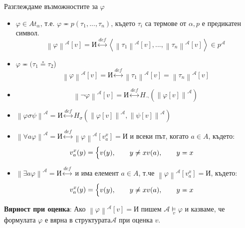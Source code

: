 \documentclass{article}
\renewcommand{\\}{\newline}
\newcommand{\I}{\text{И}}
\begin{document}
Разглеждаме възможностите за \(\varphi\)  
\begin{itemize}
    \item \(\varphi \in At_{\alpha}\), т.е. \(\varphi \eqcirc p(\tau_1, ..., \tau_n)\), където \(\tau_i\) са термове от \(\alpha, p\) е предикатен символ. \[
        \left\|\varphi\right\|^{\mathcal{A}}[v]=\I \overset{def}{\leftrightarrow} \left\langle \left\|\tau_1\right\|^{\mathcal{A}}[v],..., \left\|\tau_n\right\|^{\mathcal{A}}[v] \right\rangle \in p^{\mathcal{A}}
    \] 
  \item \(\varphi \eqcirc (\tau_1 \circeq \tau_2\)) \[
      \left\|\varphi\right\|^{\mathcal{A}}[v] = \I \overset{def}{\leftrightarrow} \left\|\tau_1\right\|^{\mathcal{A}}[v] = \left\|\tau_n\right\|^{\mathcal{A}}[v]  
  \]  
\item \[ \left\|\lnot\varphi\right\|^{\mathcal{A}}[v] = \I \overset{def}{\leftrightarrow} H_{\lnot}(\left\|\varphi[v]\right\|^{\mathcal{A}}) \]
\item \( \left\|\varphi \sigma \psi\right\|^{\mathcal{A}} = \I \overset{def}{\leftrightarrow} H_{\sigma}(\left\|\varphi[v]\right\|^{\mathcal{A}}, \left\|\psi[v]\right\|^{\mathcal{A}}) \)
  \item \( \left\|\forall a \varphi\right\|^{\mathcal{A}} = \I \overset{def}{\leftrightarrow} \left\|\varphi\right\|^{\mathcal{A}}[v_{a}^{x}] = \I\) и всеки път, когато \(a \in A\), където: \[
      v_{a}^{x}(y) = \begin{cases}
        v(y), \qquad y \not\eqcirc x \\
        v(a), \qquad y \eqcirc x \\
    \end{cases}
  \]   
  \item \( \left\|\exists a \varphi\right\|^{\mathcal{A}} = \I \overset{def}{\leftrightarrow}\) и има елемент \(a \in A\), т.че \(\left\|\varphi\right\|^{\mathcal{A}}[v_{a}^{x}] = \I\),  където: \[
      v_{a}^{x}(y) = \begin{cases}
        v(y), \qquad y \not\eqcirc x \\
        v(a), \qquad y \eqcirc x \\
    \end{cases}
  \]   
\end{itemize}

\textbf{Вярност при оценка}: Ако \(\left\|\varphi\right\|^{\mathcal{A}}[v] = \I\) пишем \(\mathcal{A} \underset{v}{\vDash} \varphi\) и казваме, че формулата \(\varphi\) е вярна в структурата\(\mathcal{A}\) при оценка \(v\).
\end{document}
